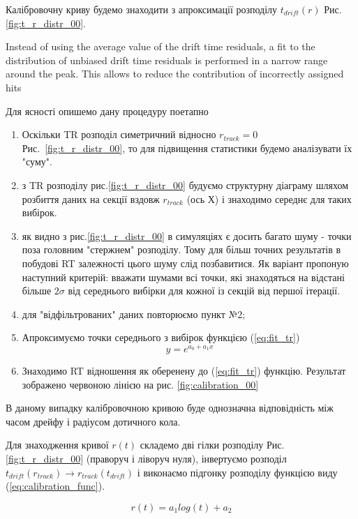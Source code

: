 \documentclass[]{article}
\begin{document}
	

	
	
	
	Калібровочну криву будемо знаходити з апроксимації розподілу $t_{drift}(r)$ Рис.\ref{fig:t_r_distr_00}.
	
	Instead of using the average value of the drift time residuals, a fit to the distribution of unbiased drift time residuals is performed in a narrow range around the peak. This allows to reduce the contribution of incorrectly assigned hits

	Для ясності опишемо дану процедуру поетапно
	\begin{enumerate}
	\item Оскільки TR розподіл симетричний відносно $r_{track} =0$ Рис.~\ref{fig:t_r_distr_00}, то для підвищення статистики будемо аналізувати їх "суму".
	\item з TR розподілу рис.\ref{fig:t_r_distr_00} будуємо структурну діаграму шляхом розбиття даних на секції вздовж $r_{track}$ (ось Х) і знаходимо середнє для таких вибірок.
	\item як видно з рис.\ref{fig:t_r_distr_00} в симуляціях є досить багато шуму - точки поза головним "стержнем" розподілу. Тому для більш точних результатів в побудові RT залежності цього шуму слід позбавитися. Як варіант пропоную наступний критерій: вважати шумами всі точки, які знаходяться на відстані більше $2 \sigma $ від середнього вибірки для кожної із секцій від першої ітерації.
	\item для "відфільтрованих" даних повторюємо пункт №2;
	\item Апроксимуємо точки середнього з вибірок функцією (\ref{eq:fit_tr})
	\begin{equation}
		y = e^{a_0 +a_1x}
		\label{eq:fit_tr}
	\end{equation}
	\item Знаходимо RT відношення як оберенену до (\ref{eq:fit_tr})  функцію. Результат зображено червоною лінією на рис. \ref{fig:calibration_00}
	\end{enumerate}
	
	
	В даному випадку калібровочною кривою буде однозначна відповідність між часом дрейфу і радіусом дотичного кола.
	
	Для знаходження кривої $r(t)$ складемо дві гілки розподілу Рис. \ref{fig:t_r_distr_00} (праворуч і ліворуч нуля),	
	 інвертуємо розподіл $t_{drift}(r_{track}) \longrightarrow r_{track}(t_{drift})$ і виконаємо підгонку розподілу функцією виду (\ref{eq:calibration_func}).
	
	\begin{equation}
		\label{eq:calibration_func}
		r(t) = a_1 log(t) + a_2
	\end{equation}
	
\end{document}
